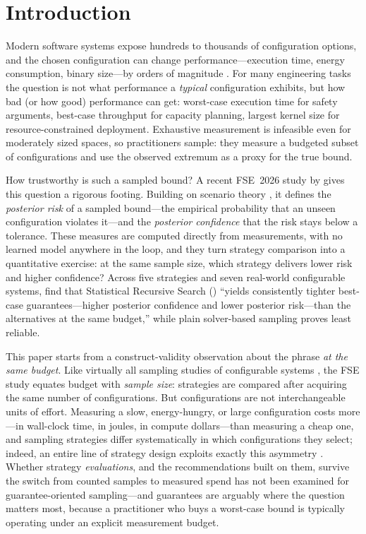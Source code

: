 \section{Introduction}
\label{sec:intro}

Modern software systems expose hundreds to thousands of configuration
options, and the chosen configuration can change performance---execution
time, energy consumption, binary size---by orders of magnitude
\citep{xu2015hey,apel2013feature,pereira2021learning}. For many
engineering tasks the question is not what performance a \emph{typical}
configuration exhibits, but how bad (or how good) performance can get:
worst-case execution time for safety arguments, best-case throughput for
capacity planning, largest kernel size for resource-constrained
deployment. Exhaustive measurement is infeasible even for moderately
sized spaces, so practitioners sample: they measure a budgeted subset of
configurations and use the observed extremum as a proxy for the true
bound.

How trustworthy is such a sampled bound? A recent FSE~2026 study by
\citet{weis2026risk} gives this question a rigorous footing. Building on
scenario theory \citep{calafiore2006scenario,campi2008exact}, it defines
the \emph{posterior risk} of a sampled bound---the empirical probability
that an unseen configuration violates it---and the \emph{posterior
confidence} that the risk stays below a tolerance. These measures are
computed directly from measurements, with no learned model anywhere in
the loop, and they turn strategy comparison into a quantitative exercise:
at the same sample size, which strategy delivers lower risk and higher
confidence? Across five strategies and seven real-world configurable
systems, \citet{weis2026risk} find that Statistical Recursive Search
(\srs) \citep{oh2017srs} ``yields consistently tighter best-case
guarantees---higher posterior confidence and lower posterior risk---than
the alternatives at the same budget,'' while plain solver-based sampling
proves least reliable.

This paper starts from a construct-validity observation about the phrase
\emph{at the same budget}. Like virtually all sampling studies of
configurable systems
\citep{kaltenecker2019distance,pereira2020sampling,guo2018dataefficient},
the FSE study equates budget with \emph{sample size}: strategies are
compared after acquiring the same number of configurations. But
configurations are not interchangeable units of effort. Measuring a
slow, energy-hungry, or large configuration costs more---in wall-clock
time, in joules, in compute dollars---than measuring a cheap one, and
sampling strategies differ systematically in which configurations they
select; indeed, an entire line of strategy design exploits exactly this
asymmetry \citep{sarkar2015cost,nair2017bad}. Whether strategy
\emph{evaluations}, and the recommendations built on them, survive the
switch from counted samples to measured spend has not been examined for
guarantee-oriented sampling---and guarantees are arguably where the
question matters most, because a practitioner who buys a worst-case bound
is typically operating under an explicit measurement budget.

